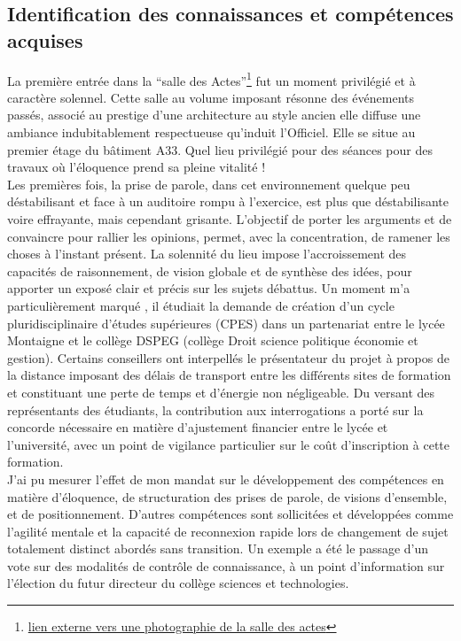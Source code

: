 \documentclass{article}
\begin{document}
\subsection{Identification des connaissances et compétences acquises}
La première entrée dans la ``salle des Actes''\footnote{\href{http://colloquebordeaux2017.socfjp.com/wp-content/uploads/2016/11/S.-des-Actes-1-768x576.jpg}{lien externe vers une photographie de la salle des actes}} fut un moment privilégié et à caractère solennel. Cette salle au volume imposant résonne des événements passés, associé au prestige d'une architecture au style ancien elle diffuse une ambiance indubitablement respectueuse qu'induit l'Officiel. Elle se situe au premier étage du bâtiment A33. Quel lieu privilégié pour des séances pour des travaux où l’éloquence prend sa pleine vitalité ! \\ Les premières fois, la prise de parole, dans cet environnement  quelque peu déstabilisant et face à un auditoire rompu à l'exercice, est plus que déstabilisante voire effrayante, mais cependant grisante. L'objectif de porter les arguments et de convaincre pour rallier les opinions, permet, avec la concentration, de ramener les choses à l'instant présent. La solennité du lieu impose l'accroissement des capacités de raisonnement, de vision globale et de synthèse des idées, pour apporter un exposé clair et précis sur les sujets débattus. Un moment m'a particulièrement marqué , il étudiait la demande de création d'un cycle pluridisciplinaire d'études supérieures (CPES) dans un partenariat entre le lycée Montaigne et le collège DSPEG (collège Droit science politique économie et gestion). Certains conseillers ont interpellés le présentateur du projet à propos de la distance imposant des délais de transport entre les différents sites de formation et constituant une perte de temps et d'énergie non négligeable. Du versant des représentants des étudiants, la contribution aux interrogations a porté sur la concorde nécessaire en matière d'ajustement financier entre le lycée et l'université, avec un point de vigilance particulier sur le coût d'inscription à cette formation. \\

J'ai pu mesurer l'effet de mon mandat sur le développement des compétences en matière d'éloquence, de structuration des prises de parole, de visions d'ensemble, et de positionnement. D'autres compétences sont sollicitées et développées comme l'agilité mentale et la capacité de reconnexion rapide lors de changement de sujet totalement distinct abordés sans transition. Un exemple a été le passage d'un vote sur des modalités de contrôle de connaissance, à un point d'information sur l'élection du futur directeur du collège sciences et technologies. \\
\end{document}

